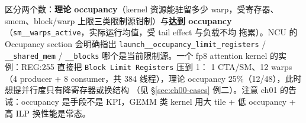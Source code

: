 区分两个数：\textbf{理论 occupancy}（kernel 资源能驻留多少 warp，受寄存器、
smem、block/warp 上限三类限制源钳制）与\textbf{达到 occupancy}
（\texttt{sm\_\allowbreak{}\_\allowbreak{}warps\_\allowbreak{}active}，实际运行均值，受 tail effect 与负载不均
拖累）。NCU 的 Occupancy section 会明确指出 \texttt{launch\_\allowbreak{}\_\allowbreak{}occupancy\_\allowbreak{}limit\_\allowbreak{}registers} /
\texttt{\_\allowbreak{}\_\allowbreak{}shared\_\allowbreak{}mem} / \texttt{\_\_blocks} 哪个是当前限制源。一个
fp8 attention kernel 的实例：REG:255 直接把 \texttt{Block Limit Registers} 压到 1：
1 CTA/SM、12 warps（4 producer + 8 consumer，共 384 线程），理论 occupancy
25\%（12/48），此时想提并行度只有降寄存器或换结构
（见 \S\ref{sec:ch00-cases} 例二）。注意 ch01 的告诫：occupancy 是手段不是
KPI，GEMM 类 kernel 用大 tile + 低 occupancy + 高 ILP 换性能是常态。

